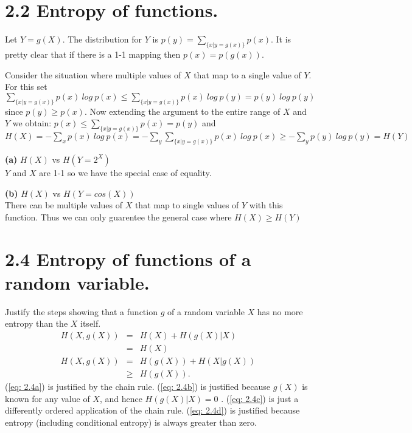 \documentclass[10pt]{article}
\newcommand{\pref}[1]{{(\ref{#1})}}
\begin{document}
\begin{tiny}
\begin{multicols}{3}
\section* {2.2 Entropy of functions.}
Let $Y=g(X)$. The distribution for $Y$ is  $p(y)=\sum_{\{x|y=g(x)\}}p(x)$.  It is pretty clear that if there is a 1-1 mapping then $p(x)=p(g(x))$. 
                          
Consider the situation where multiple values of $X$ that map to a single value of $Y$.
For this set $\sum_{\{x|y=g(x)\}}p(x)\ log\ p(x) \leq \sum_{\{x|y=g(x)\}}p(x)\ log\ p(y) = p(y)\ log\ p(y)$ since $p(y)\geq p(x)$. Now extending the argument to the entire range of $X$ and $Y$ we obtain:
\(
p(x)\leq \sum_{\{x|y=g(x)\}}p(x)=p(y)\) and \(
H(X)=-\sum_{x}p(x)\ log\ p(x)
=-\sum_{y}\sum_{\{x|y=g(x)\}}p(x)\ log\ p(x)
\geq -\sum_{y}p(y)\ log\ p(y)
=H(Y)
\)

\textbf{(a)} $H(X)$ vs $H(Y=2^{X})$\\
$Y$ and $X$ are 1-1 so we have the special case of equality.

\textbf{(b)} $H(X)$ vs $H(Y=cos(X))$ \\
There can be multiple values of $X$ that map to single values of $Y$ with this function. Thus we can only guarentee the general case where $H(X) \geq H(Y)$

\section*{2.4 Entropy of functions of a random variable.}
Justify the steps showing that a function $g$ of a random variable $X$ has no
more entropy than the $X$ itself.
\begin{eqnarray}
H(X,g(X))  &=& H(X) + H(g(X) | X) \label{eq: 2.4a} \\
    &=& H(X) \label{eq: 2.4b} \\
    H(X,g(X)) &=& H(g(X))+H(X|g(X)) \label{eq: 2.4c} \\
    &\geq& H(g(X)) \label{eq: 2.4d}.
\end{eqnarray}
\pref{eq: 2.4a} is justified by the chain rule.
\pref{eq: 2.4b} is justified because $g(X)$ is known for any value of $X$,
and hence $H(g(X)|X)=0$ . 
\pref{eq: 2.4c} is just a differently ordered application of the chain rule.
\pref{eq: 2.4d} is justified because entropy (including conditional entropy) is always greater
than zero.


\end{multicols}
\end{tiny}
\end{document}
